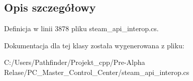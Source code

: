 \subsection{Opis szczegółowy}


Definicja w linii 3878 pliku steam\+\_\+api\+\_\+interop.\+cs.



Dokumentacja dla tej klasy została wygenerowana z pliku\+:\begin{DoxyCompactItemize}
\item 
C\+:/\+Users/\+Pathfinder/\+Projekt\+\_\+cpp/\+Pre-\/\+Alpha Relase/\+P\+C\+\_\+\+Master\+\_\+\+Control\+\_\+\+Center/steam\+\_\+api\+\_\+interop.\+cs\end{DoxyCompactItemize}
